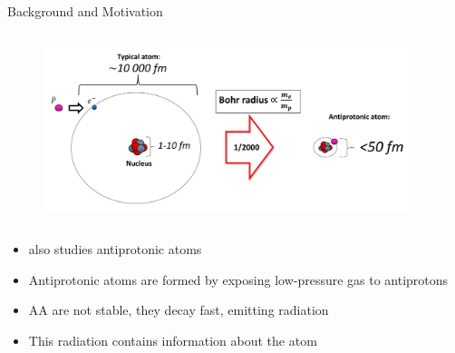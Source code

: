 \begin{columnframe}{Background and Motivation}
    \begin{column}{0.5\textwidth}
        \begin{figure}
            \centering
            \includegraphics[width=0.95\textwidth, frame]{images/antiprotonic_atom_diagram.png}
        \end{figure}
    \end{column}
    \begin{column}{0.5\textwidth}
        \begin{itemize}
            \item \aegis also studies antiprotonic atoms
            \item Antiprotonic atoms are formed by exposing low-pressure gas to antiprotons
            \item AA are not stable, they decay fast, emitting radiation
            \item This radiation contains information about the atom
        \end{itemize}
    \end{column}
\end{columnframe}

